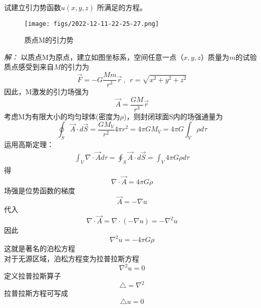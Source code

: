 \begin{example}
试建立引力势函数$ u(x,y,z) $ 所满足的方程。
\begin{figure}[htbp]
	\centering
	\texttt{[image: figs/2022-12-11-22-25-27.png]}
	\caption{质点M的引力势}
\end{figure}
\end{example}
\emph{解：}
以质点M为原点，建立如图坐标系，空间任意一点（$x,y,z$）质量为$m$的试验质点感受到来自$M$的引力为\\
   $$ \overrightarrow{F} =-G\dfrac{Mm}{r^3} \overrightarrow {r}~,~~ r=\sqrt{x^2+y^2+z^2}$$
  因此，M激发的引力场强为 \\
  $$ \overrightarrow{A} =\dfrac{GM}{r^3} \overrightarrow{r} $$
考虑M为有限大小的均匀球体(密度为$\rho$)，则封闭球面S内的场强通量为 \\
$$\displaystyle \oint_{S} \overrightarrow{A} \cdot d \overrightarrow{S} = \frac{GM_V}{r^2} 4\pi r^2 = 4\pi GM_V = 4\pi G \int_V \rho d\tau $$
运用高斯定理：\\
  $$ \begin{aligned}
	  \int_V  \nabla \cdot \overrightarrow{A} d\tau = \oint_{S} \overrightarrow{A} \cdot d \overrightarrow{S}
	  = \int_V 4\pi G \rho d\tau
  \end{aligned}  $$
  得 
  \begin{equation*}
	  \nabla \cdot \overrightarrow{A} = 4\pi G \rho
  \end{equation*}
场强是位势函数的梯度
  \begin{equation}\label{eq:force}
	  \overrightarrow{A} =-\nabla u
  \end{equation} 
代入 $$\nabla \cdot \overrightarrow{A} = \nabla \cdot \left(-\nabla u\right)= -\nabla ^2 u$$ 
因此
  \begin{equation}
	  \nabla ^2 u= -4\pi G \rho 
  \end{equation}
这就是著名的泊松方程
~~\\ 
对于无源区域，泊松方程变为拉普拉斯方程
\begin{equation} \label{eq:laplace}
	\boxed{\nabla ^2  u =0} 
\end{equation}
定义拉普拉斯算子
\begin{equation*}
	\triangle  = \nabla ^2 
\end{equation*}
拉普拉斯方程可写成
\begin{equation*}
	\triangle   u =0 
\end{equation*}   

~~\\ 

